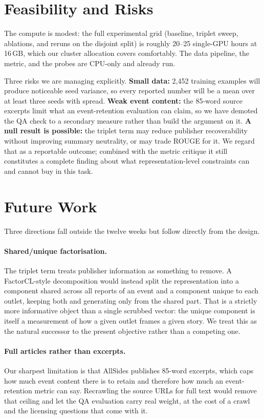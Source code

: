 \documentclass[11pt]{article}
\begin{document}
\section{Feasibility and Risks}

The compute is modest: the full experimental grid (baseline, triplet sweep,
ablations, and reruns on the disjoint split) is roughly 20--25 single-GPU
hours at 16\,GB, which our cluster allocation covers comfortably. The data
pipeline, the metric, and the probes are CPU-only and already run.

Three risks we are managing explicitly. \textbf{Small data:} 2{,}452 training
examples will produce noticeable seed variance, so every reported number will be
a mean over at least three seeds with spread. \textbf{Weak event content:} the
85-word source excerpts limit what an event-retention evaluation can claim, so we
have demoted the QA check to a secondary measure rather than build the argument
on it. \textbf{A null result is possible:} the triplet term may reduce publisher
recoverability without improving summary neutrality, or may trade ROUGE for it.
We regard that as a reportable outcome; combined with the metric critique it
still constitutes a complete finding about what representation-level constraints
can and cannot buy in this task.

\section{Future Work}

Three directions fall outside the twelve weeks but follow directly from the
design.

\paragraph{Shared/unique factorisation.} The triplet term treats publisher
information as something to remove. A FactorCL-style decomposition
\citep{liang2023factorcl} would instead split the representation into a
component shared across all reports of an event and a component unique to each
outlet, keeping both and generating only from the shared part. That is a
strictly more informative object than a single scrubbed vector: the unique
component is itself a measurement of how a given outlet frames a given story.
We treat this as the natural successor to the present objective rather than a
competing one.

\paragraph{Full articles rather than excerpts.} Our sharpest limitation is that
AllSides publishes 85-word excerpts, which caps how much event content there is
to retain and therefore how much an event-retention metric can say. Recrawling
the source URLs for full text would remove that ceiling and let the QA
evaluation carry real weight, at the cost of a crawl and the licensing questions
that come with it.
\end{document}
